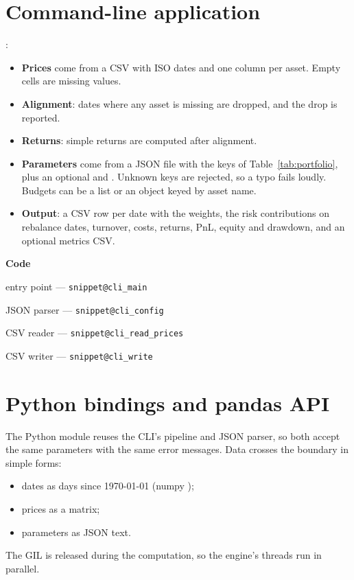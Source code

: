 \documentclass[11pt,a4paper]{article}
\makeatletter
\newcommand{\snippetsource}[1]{\csname snippet@#1\endcsname}
\newenvironment{codepointers}{%
  \par\smallskip\begingroup\footnotesize\noindent\textcolor{blue!50!black}{\textbf{Code}}\par\nopagebreak
  \begin{list}{}{\setlength{\leftmargin}{1.2em}\setlength{\itemsep}{0pt}\setlength{\parsep}{0pt}\setlength{\topsep}{1pt}}}%
  {\end{list}\endgroup\smallskip}
\newcommand{\codeitem}[2]{\item #2 --- \texttt{\snippetsource{#1}}}
\makeatother
\begin{document}
\section{Command-line application}\label{sec:cli}
:
\begin{itemize}
  \item \textbf{Prices} come from a CSV with ISO dates and one column per asset. Empty
        cells are missing values.
  \item \textbf{Alignment}: dates where any asset is missing are dropped, and the drop is
        reported.
  \item \textbf{Returns}: simple returns are computed after alignment.
  \item \textbf{Parameters} come from a JSON file with the keys of
        Table~\ref{tab:portfolio}, plus an optional  and . Unknown
        keys are rejected, so a typo fails loudly. Budgets can be a list or an object keyed
        by asset name.
  \item \textbf{Output}: a CSV row per date with the weights, the risk contributions on
        rebalance dates, turnover, costs, returns, PnL, equity and drawdown, and an optional
        metrics CSV.
\end{itemize}
\begin{codepointers}
  \codeitem{cli_main}{entry point}
  \codeitem{cli_config}{JSON parser}
  \codeitem{cli_read_prices}{CSV reader}
  \codeitem{cli_write}{CSV writer}
\end{codepointers}

\section{Python bindings and pandas API}\label{sec:bindings}
The Python module reuses the CLI's pipeline and JSON parser, so both accept the same
parameters with the same error messages. Data crosses the boundary in simple forms:
\begin{itemize}
  \item dates as  days since 1970-01-01 (numpy );
  \item prices as a  matrix;
  \item parameters as JSON text.
\end{itemize}
The GIL is released during the computation, so the engine's threads run in parallel.
\end{document}
